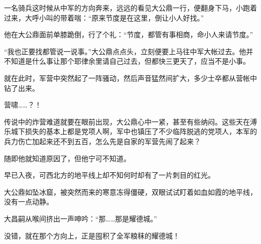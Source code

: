 一名骑兵这时候从中军的方向奔来，远远的看见大公鼎一行，便翻身下马，小跑着过来，大呼小叫的带着喘：“原来节度是在这里，倒让小人好找。”

他在大公鼎面前单膝跪倒，行了个礼：“节度，都管有事相商，命小人来请节度。”

“我也正要找都管说一说事。”大公鼎点点头，立刻便要上马往中军大帐过去。他并不知道是什么事让那个耶律余里请自己过去，但都快三更天了，应当不是小事。

就在此时，军营中突然起了一阵骚动，然后声音猛然间扩大，多少士卒都从营帐中钻了出来。

营啸……？！

传说中的炸营难道就要在眼前出现，大公鼎心中一紧，甚至有些纳闷。这些天在溥乐城下损失的基本上都是党项人啊，军中也镇压了不少临阵脱逃的党项人，本军的兵力伤亡加起来还不到五百，怎么先是自家的军营先闹了起来？

随即他就知道原因了，但他宁可不知道。

早已入夜，可西北方的地平线上却不知何时却有了一片刺目的红光。

大公鼎如坠冰窟，被突然而来的寒意冻得僵硬，双眼试试盯着如血如霞的地平线，没有一点动静。

大昌嗣从喉间挤出一声呻吟：“那……那是耀德城。”

没错，就在那个方向上，正是囤积了全军粮秣的耀德城！
